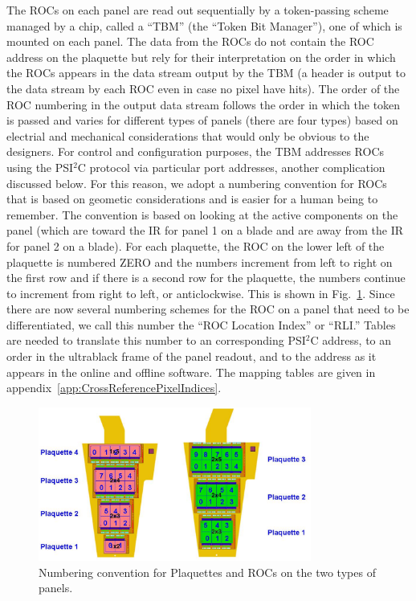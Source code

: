 \documentclass{cmspaper}
\begin{document}
The ROCs on each panel are read out sequentially by a token-passing scheme 
managed by a chip, called a ``TBM'' (the ``Token Bit Manager''),
one of which  is mounted on each panel. The data from the ROCs
do not contain the ROC address on the plaquette but
rely for their interpretation on the
order in which the ROCs appears in the data stream output by the TBM 
(a header is output to the data stream by each ROC even in case no pixel have hits).
The order of the ROC numbering in the output data stream follows 
the order in which the token is passed and varies for different types of
panels (there are four types) based on electrial and mechanical considerations
that would only be obvious to the designers. For control and configuration 
purposes, the TBM addresses ROCs using the PSI$^2$C protocol via particular
port addresses, another complication discussed below.
For this reason, we adopt a 
numbering convention for ROCs that is based on geometic considerations
and is easier for a human being to remember. The convention is based on
looking at the active components on the panel (which are
toward the IR  for panel 1 on a 
blade and are away from the  IR for panel 2 on a blade). 
For each plaquette, the 
ROC on the lower left of the plaquette is numbered ZERO and the numbers 
increment from left to right on the first row and if there is a second row 
for the plaquette, the numbers continue to increment from right to left, or anticlockwise.
This  is shown  
in Fig.~\ref{figure:roc_numbering}. Since there are now several numbering
schemes for the ROC on a panel that need to be differentiated, we call this 
number the ``ROC Location Index'' or ``RLI.'' Tables are needed to 
translate this number to an corresponding PSI$^2$C address, to an order in
the ultrablack frame of the panel readout, and to the address as it appears in 
the online and offline software. The mapping tables are given in 
appendix~\ref{app:CrossReferencePixelIndices}. 

\begin{figure}[hbtp]
  \begin{center}
\includegraphics[width =0.8\textwidth]{ROC_config_numbers.eps}
    \caption{Numbering convention for Plaquettes and ROCs on
            the two types of panels. }
    \label{figure:roc_numbering}
  \end{center}
\end{figure}
\end{document}
